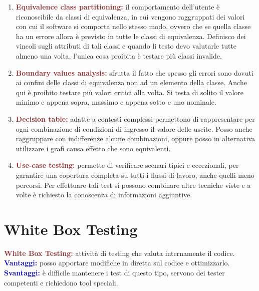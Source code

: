 \begin{enumerate}
  \item \textbf{\textcolor{brown}{Equivalence class partitioning:}} il comportamento dell'utente è riconoscibile da classi di equivalenza, in cui vengono raggruppati dei valori con cui
    il software si comporta nello stesso modo, ovvero che se quella classe ha un errore allora è previsto in tutte le classi di equivalenza. Definisco dei
    vincoli sugli attributi di tali classi e quando li testo devo valutarle tutte almeno una volta, l'unica cosa proibita è testare più classi invalide.
  \item \textbf{\textcolor{brown}{Boundary values analysis:}} sfrutta il fatto che spesso gli errori sono dovuti ai confini delle classi di equivalenza non ad un elemento della classe.
    Anche qui è proibito testare più valori critici alla volta. Si testa di solito il valore minimo e appena sopra, massimo e appena sotto e uno nominale.
\item \textbf{\textcolor{brown}{Decision table:}} adatte a contesti complessi permettono di rappresentare per ogni combinazione di condizioni di ingresso il valore delle uscite.
    Posso anche raggruppare con indifferenze alcune combinazioni, oppure posso in alternativa utilizzare i grafi causa effetto che sono equivalenti.
  \item \textbf{\textcolor{brown}{Use-case testing:}} permette di verificare scenari tipici e eccezionali, per garantire una copertura completa su tutti i flussi di lavoro, anche quelli
    meno percorsi. Per effettuare tali test si possono combinare altre tecniche viste e a volte è richiesto la conoscenza di informazioni aggiuntive.
\end{enumerate}


\section{White Box Testing}
\begin{boxDef}
\textbf{\textcolor{brown}{White Box Testing:}} attività di testing che valuta internamente il codice.  \\
\textbf{\textcolor{blue}{Vantaggi:}} posso apportare modifiche in diretta sul codice e ottimizzarlo.\\ 
\textbf{\textcolor{blue}{Svantaggi:}} è difficile mantenere i test di questo tipo, servono dei tester competenti e richiedono tool speciali.
\end{boxDef}


